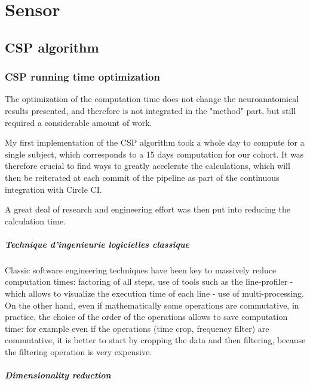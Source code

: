 
\chapter{Sensor}


\section{CSP algorithm}

\subsection{CSP running time optimization}
\label{Sec:running_time_optimisation}

The optimization of the computation time does not change the neuroanatomical results presented, and therefore is not integrated in the "method" part, but still required a considerable amount of work.

My first implementation of the CSP algorithm took a whole day to compute for a single subject, which corresponds to a 15 days computation for our cohort. It was therefore crucial to find ways to greatly accelerate the calculations, which will then be reiterated at each commit of the pipeline as part of the continuous integration with Circle CI.

A great deal of research and engineering effort was then put into reducing the calculation time.

\paragraph{Technique d'ingenieurie logicielles classique}

Classic software engineering techniques have been key to massively reduce computation times: factoring of all steps, use of tools such as the line-profiler - which allows to visualize the execution time of each line -  use of multi-processing. On the other hand, even if mathematically some operations are commutative, in practice, the choice of the order of the operations allows to save computation time: for example even if the operations (time crop, frequency filter) are commutative, it is better to start by cropping the data and then filtering, because the filtering operation is very expensive.

\paragraph{Dimensionality reduction}

